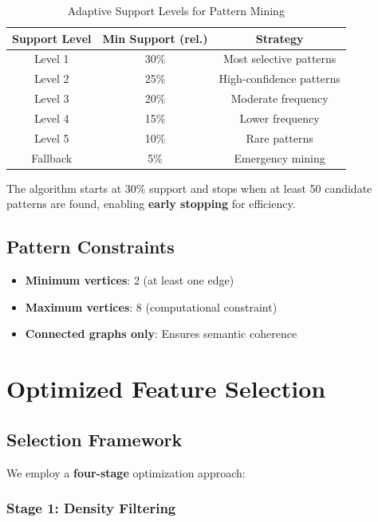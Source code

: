 \documentclass[12pt,a4paper]{article}
\begin{document}
\begin{table}[H]
\centering
\begin{tabular}{ccc}
\toprule
\textbf{Support Level} & \textbf{Min Support (rel.)} & \textbf{Strategy} \\
\midrule
Level 1 & 30\% & Most selective patterns \\
Level 2 & 25\% & High-confidence patterns \\
Level 3 & 20\% & Moderate frequency \\
Level 4 & 15\% & Lower frequency \\
Level 5 & 10\% & Rare patterns \\
Fallback & 5\% & Emergency mining \\
\bottomrule
\end{tabular}
\caption{Adaptive Support Levels for Pattern Mining}
\end{table}

The algorithm starts at 30\% support and stops when at least 50 candidate patterns are found, enabling \textbf{early stopping} for efficiency.

\subsection{Pattern Constraints}

\begin{itemize}
    \item \textbf{Minimum vertices}: 2 (at least one edge)
    \item \textbf{Maximum vertices}: 8 (computational constraint)
    \item \textbf{Connected graphs only}: Ensures semantic coherence
\end{itemize}

\section{Optimized Feature Selection}

\subsection{Selection Framework}

We employ a \textbf{four-stage} optimization approach:

\subsubsection{Stage 1: Density Filtering}
\end{document}
